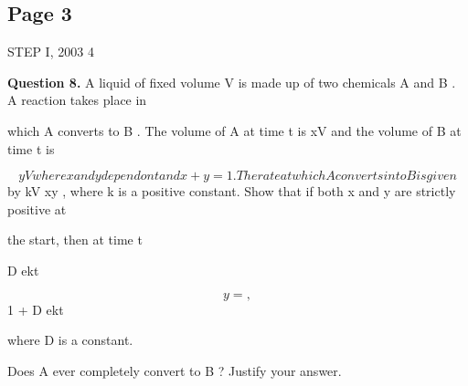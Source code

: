 \documentclass[12pt]{article}
\begin{document}
\subsection*{Page 3}
\begin{flushleft}
STEP I, 2003 4\par
\bigskip\textbf{Question 8.} A liquid of fixed volume V is made up of two chemicals A and B . A reaction takes place in\par
which A converts to B . The volume of A at time t is xV and the volume of B at time t is\par
\[yV where x and y depend on t and x + y = 1 . The rate at which A converts into B is given\]
by kV xy , where k is a positive constant. Show that if both x and y are strictly positive at\par
the start, then at time t\par
D ekt\par
\[y = ,\]
1 + D ekt\par
where D is a constant.\par
Does A ever completely convert to B ? Justify your answer.\par
\end{flushleft}
\end{document}
